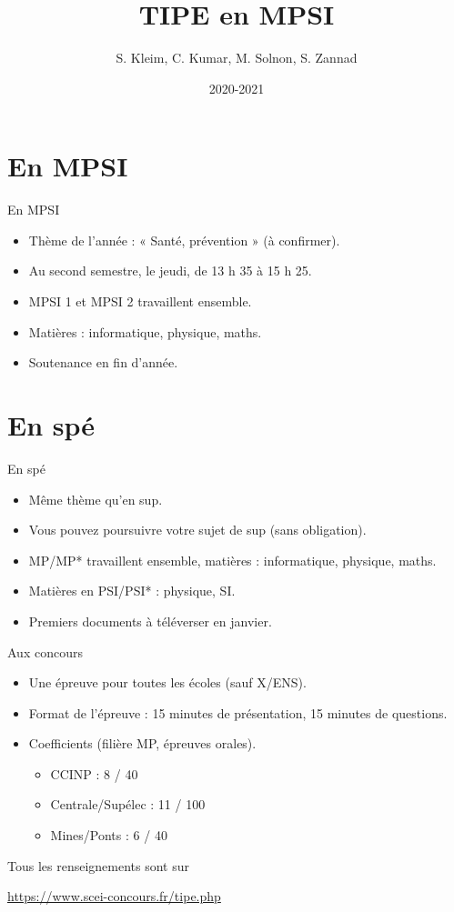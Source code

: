 \documentclass{beamer}
\title{TIPE en MPSI}
\author{S. Kleim, C. Kumar, M. Solnon, S. Zannad}
\institute{Lycée La Martinière Monplaisir, Lyon}
\date{2020-2021}
\begin{document}
\begin{frame}
\titlepage
\end{frame}
\section{En MPSI}
\begin{frame}{En MPSI}
\begin{itemize}
\item Thème de l'année : « Santé, prévention » (à confirmer). 
\item Au second semestre, le jeudi, de 13 h 35 à 15 h 25.
\item MPSI 1 et MPSI 2 travaillent ensemble. 
\item Matières : informatique, physique, maths. 
\item Soutenance en fin d'année. 
\end{itemize}

\end{frame}

\section{En spé}
\begin{frame}{En spé}
\begin{itemize}
\item Même thème qu'en sup. 
\item Vous pouvez poursuivre votre sujet de sup (sans obligation). 
\item MP/MP* travaillent ensemble, matières : informatique, physique, maths.
\item Matières en PSI/PSI* : physique, SI. 
\item Premiers documents à téléverser en janvier. 
\end{itemize}
\end{frame}

\begin{frame}{Aux concours}
    \begin{itemize}
        \item Une épreuve pour toutes les écoles (sauf X/ENS). 
        \item Format de l'épreuve : 15 minutes de présentation, 15 minutes de questions. 
        \item Coefficients (filière MP, épreuves orales). 
            \begin{itemize}
                \item CCINP : 8 / 40
                \item Centrale/Supélec : 11 / 100
                \item Mines/Ponts : 6 / 40
            \end{itemize}
    \end{itemize}
    Tous les renseignements sont sur 
    \begin{center}
        \url{https://www.scei-concours.fr/tipe.php}
    \end{center}
\end{frame}
\end{document}
